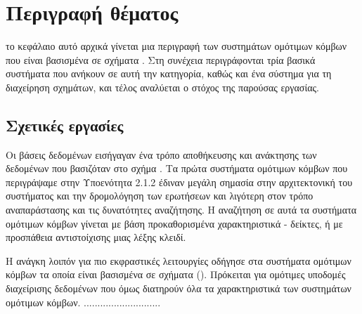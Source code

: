 \chapter{Περιγραφή θέματος}
το κεφάλαιο αυτό αρχικά γίνεται μια περιγραφή των συστημάτων ομότιμων κόμβων που είναι βασισμένα σε σχήματα . Στη συνέχεια περιγράφονται τρία βασικά συστήματα που ανήκουν σε αυτή την κατηγορία, καθώς και ένα σύστημα για τη διαχείρηση  σχημάτων, και τέλος αναλύεται ο στόχος
της παρούσας εργασίας.

\section{Σχετικές εργασίες}
Οι βάσεις δεδομένων εισήγαγαν ένα τρόπο αποθήκευσης και ανάκτησης
των δεδομένων που βασιζόταν στο σχήμα \cite{elli05}. Τα
πρώτα συστήματα ομότιμων κόμβων που περιγράψαμε στην Υποενότητα
2.1.2 έδιναν μεγάλη σημασία στην αρχιτεκτονική του συστήματος και
την δρομολόγηση των ερωτήσεων και λιγότερη στον τρόπο
αναπαράστασης και τις δυνατότητες αναζήτησης. Η αναζήτηση σε αυτά
τα συστήματα ομότιμων κόμβων γίνεται με βάση προκαθορισμένα
χαρακτηριστικά - δείκτες, ή με προσπάθεια αντιστοίχισης μιας λέξης
κλειδί. 

Η ανάγκη λοιπόν για πιο εκφραστικές λειτουργίες οδήγησε στα
συστήματα ομότιμων κόμβων τα οποία είναι βασισμένα σε σχήματα
(). Πρόκειται για ομότιμες
υποδομές διαχείρισης δεδομένων που όμως διατηρούν όλα τα
χαρακτηριστικά των συστημάτων ομότιμων κόμβων.
............................